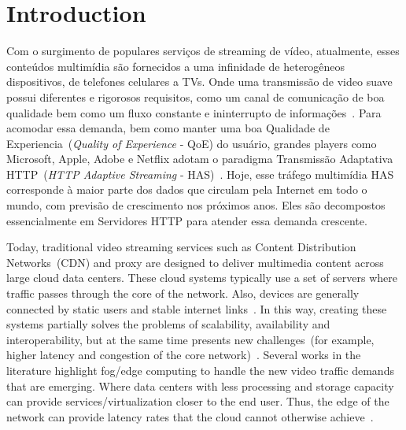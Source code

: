 \section{Introduction}
\label{sec:intro}

Com o surgimento de populares serviços de streaming de vídeo, atualmente, esses conteúdos multimídia são fornecidos a uma infinidade de heterogêneos dispositivos, de telefones celulares a TVs. Onde uma transmissão de video suave possui diferentes e rigorosos requisitos, como um canal de comunicação de boa qualidade bem como um fluxo constante e ininterrupto de informações~\cite{Immich2018WinNet}. Para acomodar essa demanda, bem como manter uma boa Qualidade de Experiencia~(\textit{Quality of Experience} - QoE) do usuário, grandes players como Microsoft, Apple, Adobe e Netflix adotam o paradigma Transmissão Adaptativa HTTP~(\textit{HTTP Adaptive Streaming} - HAS)~\cite{company:dashs}. Hoje, esse tráfego multimídia HAS corresponde à maior parte dos dados que circulam pela Internet em todo o mundo, com previsão de crescimento nos próximos anos. Eles são decompostos essencialmente em Servidores HTTP para atender essa demanda crescente.





Today, traditional video streaming services such as Content Distribution Networks~(CDN) and proxy are designed to deliver multimedia content across large cloud data centers. These cloud systems typically use a set of servers where traffic passes through the core of the network. Also, devices are generally connected by static users and stable internet links~\cite{sitaraman:ACD2014}. In this way, creating these systems partially solves the problems of scalability, availability and interoperability, but at the same time presents new challenges~(for example, higher latency and congestion of the core network)~\cite{tran:wons17,ye:ITC17, taleb:JSAC18}. Several works in the literature highlight fog/edge computing to handle the new video traffic demands that are emerging. Where data centers with less processing and storage capacity can provide services/virtualization closer to the end user. Thus, the edge of the network can provide latency rates that the cloud cannot otherwise achieve~\cite{gamaUCC2019, rosarioSENSORS2018}.

